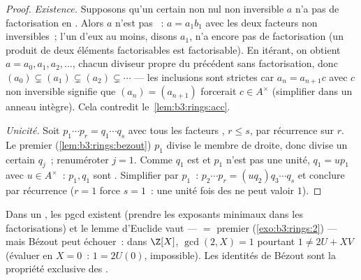 \begin{proof}
\emph{Existence.} Supposons qu'un certain non nul non inversible
$a$ n'a pas de factorisation en . Alors $a$ n'est
pas ~: $a = a_1b_1$ avec les deux facteurs non
inversibles~; l'un d'eux au moins, disons $a_1$, n'a encore pas
de factorisation (un produit de deux éléments factorisables est
factorisable). En itérant, on obtient $a = a_0, a_1, a_2,
\dots$, chacun diviseur propre du précédent sans factorisation,
donc $(a_0) \subsetneq (a_1) \subsetneq (a_2) \subsetneq
\cdots$ --- les inclusions sont strictes car $a_n = a_{n+1}c$
avec $c$ non inversible signifie que $(a_n) = (a_{n+1})$
forcerait $c \in A^\times$ (simplifier dans un anneau intègre).
Cela contredit le~\cref{lem:b3:rings:acc}.

\emph{Unicité.} Soit $p_1 \cdots p_r = q_1 \cdots q_s$ avec tous
les facteurs , $r \leq s$, par récurrence sur $r$.
Le premier (\cref{lem:b3:rings:bezout}) $p_1$ divise le membre
de droite, donc divise un certain $q_j$~; renuméroter $j = 1$.
Comme $q_1$ est  et $p_1$ n'est pas une unité, $q_1
= u p_1$ avec $u \in A^\times$~: $p_1, q_1$ sont .
Simplifier par $p_1$~: $p_2 \cdots p_r = (u q_2) q_3\cdots q_s$
et conclure par récurrence ($r = 1$ force $s = 1$~: une unité
fois des  ne peut valoir $1$).
\end{proof}

\begin{remark}\label{rem:b3:rings:ufdgcd}
Dans un , les pgcd existent (prendre les exposants minimaux
dans les factorisations) et le lemme d'Euclide vaut ---
 $=$ premier (\cref{exo:b3:rings:2}) --- mais
Bézout peut échouer~: dans $\Z[X]$, $\gcd(2, X) = 1$ pourtant $1
\neq 2U + XV$ (évaluer en $X = 0$~: $1 = 2U(0)$, impossible).
Les identités de Bézout sont la propriété exclusive des .
\end{remark}


